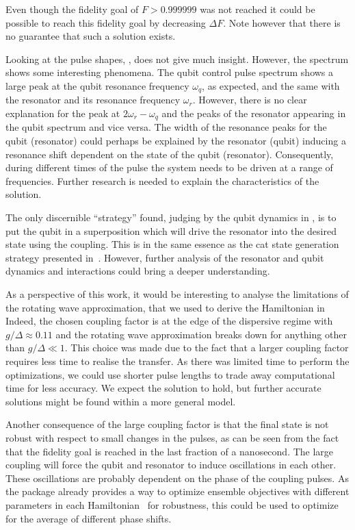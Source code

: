 \documentclass[main.tex]{subfiles}
\begin{document}
Even though the fidelity goal of \(F > 0.999999\) was not reached it could be possible to reach this fidelity goal by decreasing \(\Delta F\).
Note however that there is no guarantee that such a solution exists.

Looking at the pulse shapes, , does not give much insight. However, the spectrum shows some interesting phenomena.
The qubit control pulse spectrum shows a large peak at the qubit resonance frequency \(\omega_q\), as expected, and the same with the resonator and its resonance frequency \(\omega_r\).
However, there is no clear explanation for the peak at \(2\omega_r-\omega_q\) and the peaks of the resonator appearing in the qubit spectrum and vice versa.
The width of the resonance peaks for the qubit (resonator) could perhaps be explained by the resonator (qubit) inducing a resonance shift dependent on the state of the qubit (resonator).
Consequently, during different times of the pulse the system needs to be driven at a range of frequencies.
Further research is needed to explain the characteristics of the solution.

The only discernible ``strategy'' found, judging by the qubit dynamics in , is to put the qubit in a superposition which will drive the resonator into the desired state using the coupling.
This is in the same essence as the cat state generation strategy presented in~\cite{haroche_exploring_2006}.
However, further analysis of the resonator and qubit dynamics and interactions could bring a deeper understanding.

As a perspective of this work, it would be interesting to analyse the limitations of the rotating wave approximation, that we used to derive the Hamiltonian in 
Indeed, the chosen coupling factor is at the edge of the dispersive regime with \(g/\Delta\approx 0.11\) and the rotating wave approximation breaks down for anything other than \(g/\Delta \ll 1\).
This choice was made due to the fact that a larger coupling factor requires less time to realise the transfer. As there was limited time to perform the optimizations, we could use shorter pulse lengths to trade away computational time for less accuracy.
We expect the solution to hold, but further accurate solutions might be found within a more general model.

Another consequence of the large coupling factor is that the final state is not robust with respect to small changes in the pulses, as can be seen from the fact that the fidelity goal is reached in the last fraction of a nanosecond.
The large coupling will force the qubit and resonator to induce oscillations in each other.
These oscillations are probably dependent on the phase of the coupling pulses.
As the \krotov{} package already provides a way to optimize ensemble objectives with different parameters in each Hamiltonian~\cite{goerz_robustness_2014} for robustness, this could be used to optimize for the average of different phase shifts.
\end{document}
